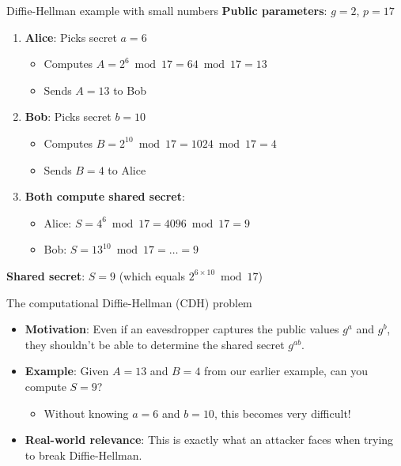 \documentclass[aspectratio=169, lualatex, handout]{beamer}
\begin{document}
\begin{frame}{Diffie-Hellman example with small numbers}
	\textbf{Public parameters}: $g = 2$, $p = 17$
	\vspace{0.5cm}
	\begin{enumerate}[<+->]
		\item \textbf{Alice}: Picks secret $a = 6$
		      \begin{itemize}
			      \item Computes $A = 2^6 \bmod 17 = 64 \bmod 17 = 13$
			      \item Sends $A = 13$ to Bob
		      \end{itemize}
		\item \textbf{Bob}: Picks secret $b = 10$
		      \begin{itemize}
			      \item Computes $B = 2^{10} \bmod 17 = 1024 \bmod 17 = 4$
			      \item Sends $B = 4$ to Alice
		      \end{itemize}
		\item \textbf{Both compute shared secret}:
		      \begin{itemize}
			      \item Alice: $S = 4^6 \bmod 17 = 4096 \bmod 17 = 9$
			      \item Bob: $S = 13^{10} \bmod 17 = \ldots = 9$
		      \end{itemize}
	\end{enumerate}
	\textbf{Shared secret}: $S = 9$ (which equals $2^{6 \times 10} \bmod 17$)
\end{frame}

\begin{frame}{The computational Diffie-Hellman (CDH) problem}
	\begin{itemize}[<+->]
		\item \textbf{Motivation}: Even if an eavesdropper captures the public values $g^a$ and $g^b$, they shouldn't be able to determine the shared secret $g^{ab}$.
		\item \textbf{Example}: Given $A = 13$ and $B = 4$ from our earlier example, can you compute $S = 9$?
		      \begin{itemize}
			      \item Without knowing $a = 6$ and $b = 10$, this becomes very difficult!
		      \end{itemize}
		\item \textbf{Real-world relevance}: This is exactly what an attacker faces when trying to break Diffie-Hellman.
	\end{itemize}
\end{frame}
\end{document}
